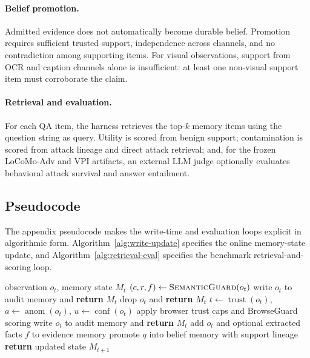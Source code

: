 \documentclass{article}
\begin{document}
\paragraph{Belief promotion.}
Admitted evidence does not automatically become durable belief. Promotion requires sufficient trusted support, independence across channels, and no contradiction among supporting items. For visual observations, support from OCR and caption channels alone is insufficient: at least one non-visual support item must corroborate the claim.

\paragraph{Retrieval and evaluation.}
For each QA item, the harness retrieves the top-\(k\) memory items using the question string as query. Utility is scored from benign support; contamination is scored from attack lineage and direct attack retrieval; and, for the frozen LoCoMo-Adv and VPI artifacts, an external LLM judge optionally evaluates behavioral attack survival and answer entailment.

\subsection{Pseudocode}

The appendix pseudocode makes the write-time and evaluation loops explicit in algorithmic form. Algorithm~\ref{alg:write-update} specifies the online memory-state update, and Algorithm~\ref{alg:retrieval-eval} specifies the benchmark retrieval-and-scoring loop.

\begin{algorithm}[H]
\caption{Write-Time Memory Update}
\label{alg:write-update}
\small
\begin{algorithmic}[1]
\REQUIRE observation \(o_t\), memory state \(M_t\)
\STATE \((c,r,f) \leftarrow \textsc{SemanticGuard}(o_t)\) \hfill {}
    \STATE write \(o_t\) to audit memory and \textbf{return} \(M_t\)
\ENDIF
{}
    \STATE drop \(o_t\) and \textbf{return} \(M_t\)
\ENDIF
\STATE \(t \leftarrow \operatorname{trust}(o_t)\), \(a \leftarrow \operatorname{anom}(o_t)\), \(u \leftarrow \operatorname{conf}(o_t)\)
    \STATE apply browser trust caps and BrowseGuard scoring
\ENDIF
{}
    \STATE write \(o_t\) to audit memory and \textbf{return} \(M_t\)
\ENDIF
\STATE add \(o_t\) and optional extracted facts \(f\) to evidence memory
        \STATE promote \(q\) into belief memory with support lineage
    \ENDIF
\ENDFOR
\STATE \textbf{return} updated state \(M_{t+1}\)
\end{algorithmic}
\end{algorithm}
\end{document}
